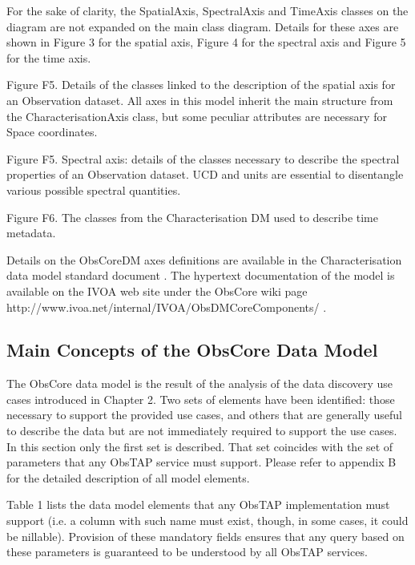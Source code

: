 \documentclass[11pt,a4paper]{ivoa}
\begin{document}
For the sake of clarity, the SpatialAxis, SpectralAxis and TimeAxis classes on the diagram are not expanded on the main
class diagram. Details for these axes are shown in Figure 3 for the spatial axis, Figure 4 for the spectral axis and
Figure 5 for the time axis.

\label{bkm:Ref158037577}Figure F5. Details of the classes linked to the description of the
spatial axis for an Observation dataset. All axes in this model inherit the main structure from the
CharacterisationAxis class, but some peculiar attributes are necessary for Space coordinates.

\label{bkm:Ref158037643}Figure F5. Spectral axis: details of the classes necessary to
describe the spectral properties of an Observation dataset. UCD and units are essential to disentangle various possible
spectral quantities.

\label{bkm:Ref291003095}Figure F6.  The classes from the Characterisation DM used to
describe time metadata.

Details on the ObsCoreDM axes definitions are available in the Characterisation data model standard document
\cite{CITATIONIVO07l1036a}. The hypertext documentation of the model is available on the IVOA web site under the
ObsCore wiki page  http://www.ivoa.net/internal/IVOA/ObsDMCoreComponents/ .

\subsection[Main Concepts of the ObsCore Data Model]{Main Concepts of the ObsCore Data Model}
The ObsCore data model is the result of the analysis of the data discovery use cases introduced in Chapter 2. Two sets
of elements have been identified: those necessary to support the provided use cases, and others that are generally
useful to describe the data but are not immediately required to support the use cases.  In this section only the first
set is described.  That set coincides with the set of parameters that any ObsTAP service must support. Please refer to
appendix B for the detailed description of all model elements. 

Table 1 lists the data model elements that any ObsTAP implementation must support (i.e. a column with such name must
exist, though, in some cases, it could be nillable).  Provision of these mandatory fields ensures that any query based
on these parameters is guaranteed to be understood by all ObsTAP services.
\end{document}
